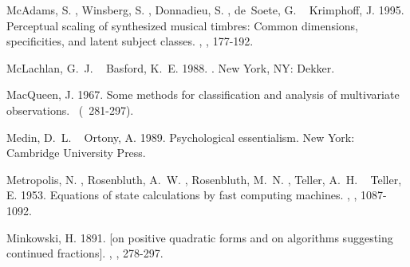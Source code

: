 \documentclass[11pt]{article}
\begin{document}
\begin{thebibliography}{}
%
%
McAdams, S.%
, Winsberg, S.%
, Donnadieu, S.%
, {de~Soete}, G.%
\BCBL{}\ \BBA{} Krimphoff, J.%
%
\newblock{}\BBOP{}1995\BBCP{}.
\newblock{}\BBOQ{}Perceptual scaling of synthesized musical timbres: Common
  dimensions, specificities, and latent subject classes.\BBCQ{}
\newblock{}, , 177-192.

%
%
{McLachlan}, G.~J.%
\BCBT{}\ \BBA{} {Basford}, K.~E.%
%
\newblock{}\BBOP{}1988\BBCP{}.
\newblock{}.
\newblock{}New York, NY: Dekker.

%
%
MacQueen, J.%
%
\newblock{}\BBOP{}1967\BBCP{}.
\newblock{}\BBOQ{}Some methods for classification and analysis of multivariate
  observations.\BBCQ{}
\newblock{}\BIn{} \ (\BPG\ 281-297).
\newblock{}

%
%
Medin, D.~L.%
\BCBT{}\ \BBA{} Ortony, A.%
%
\newblock{}\BBOP{}1989\BBCP{}.
\newblock{}\BBOQ{}Psychological essentialism.\BBCQ{}
\newblock{}\BIn{} 
\newblock{}New York: Cambridge University Press.

%
%
Metropolis, N.%
, Rosenbluth, A.~W.%
, Rosenbluth, M.~N.%
, Teller, A.~H.%
\BCBL{}\ \BBA{} Teller, E.%
%
\newblock{}\BBOP{}1953\BBCP{}.
\newblock{}\BBOQ{}Equations of state calculations by fast computing
  machines.\BBCQ{}
\newblock{}, , 1087-1092.

%
%
Minkowski, H.%
%
\newblock{}\BBOP{}1891\BBCP{}.
\newblock{}\BBOQ{}[on positive quadratic forms and on algorithms suggesting
  continued fractions].\BBCQ{}
\newblock{},
  , 278-297.


\end{thebibliography}
\end{document}
